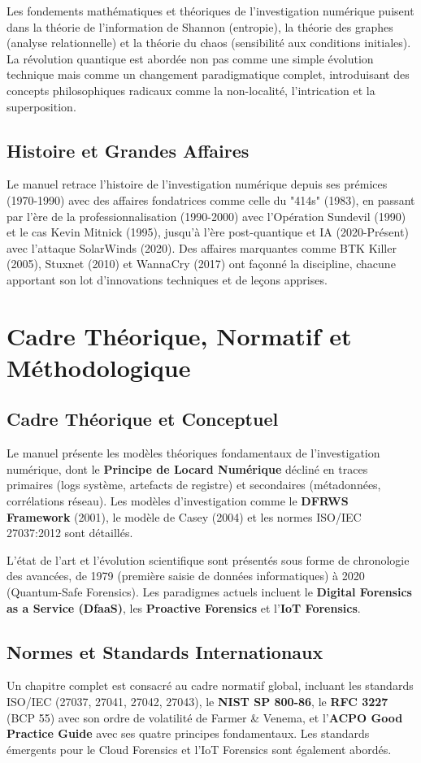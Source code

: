 \documentclass[12pt, a4paper]{article}
\begin{document}
Les fondements mathématiques et théoriques de l'investigation numérique puisent dans la théorie de l'information de Shannon (entropie), la théorie des graphes (analyse relationnelle) et la théorie du chaos (sensibilité aux conditions initiales). La révolution quantique est abordée non pas comme une simple évolution technique mais comme un changement paradigmatique complet, introduisant des concepts philosophiques radicaux comme la non-localité, l'intrication et la superposition.

\subsection{Histoire et Grandes Affaires}
Le manuel retrace l'histoire de l'investigation numérique depuis ses prémices (1970-1990) avec des affaires fondatrices comme celle du "414s" (1983), en passant par l'ère de la professionnalisation (1990-2000) avec l'Opération Sundevil (1990) et le cas Kevin Mitnick (1995), jusqu'à l'ère post-quantique et IA (2020-Présent) avec l'attaque SolarWinds (2020). Des affaires marquantes comme BTK Killer (2005), Stuxnet (2010) et WannaCry (2017) ont façonné la discipline, chacune apportant son lot d'innovations techniques et de leçons apprises.

\section{Cadre Théorique, Normatif et Méthodologique}

\subsection{Cadre Théorique et Conceptuel}
Le manuel présente les modèles théoriques fondamentaux de l'investigation numérique, dont le \textbf{Principe de Locard Numérique} décliné en traces primaires (logs système, artefacts de registre) et secondaires (métadonnées, corrélations réseau). Les modèles d'investigation comme le \textbf{DFRWS Framework} (2001), le modèle de Casey (2004) et les normes ISO/IEC 27037:2012 sont détaillés.

L'état de l'art et l'évolution scientifique sont présentés sous forme de chronologie des avancées, de 1979 (première saisie de données informatiques) à 2020 (Quantum-Safe Forensics). Les paradigmes actuels incluent le \textbf{Digital Forensics as a Service (DfaaS)}, les \textbf{Proactive Forensics} et l'\textbf{IoT Forensics}.

\subsection{Normes et Standards Internationaux}
Un chapitre complet est consacré au cadre normatif global, incluant les standards ISO/IEC (27037, 27041, 27042, 27043), le \textbf{NIST SP 800-86}, le \textbf{RFC 3227} (BCP 55) avec son ordre de volatilité de Farmer \& Venema, et l'\textbf{ACPO Good Practice Guide} avec ses quatre principes fondamentaux. Les standards émergents pour le Cloud Forensics et l'IoT Forensics sont également abordés.
\end{document}
